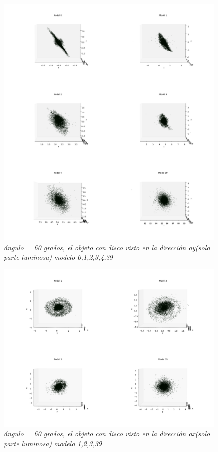 \documentclass[12pt]{article} %
\renewcommand{\=}[1]{\stackrel{#1}{=}} %
\theoremstyle{definition}
\theoremstyle{remark}
\begin{document}
\begin{figure}[!ht]
 \centering
 \includegraphics[scale=0.2]{60deg-m-c2y.png}
 \caption{\emph{ ángulo = 60 grados, el objeto con disco visto en la dirección oy(solo parte luminosa) modelo 0,1,2,3,4,39 }}
\end{figure}

\begin{figure}[!ht]
 \centering
 \includegraphics[scale=0.2]{60deg-m-c2.png}
 \caption{\emph{ ángulo = 60 grados, el objeto con disco visto en la dirección ox(solo parte luminosa) modelo 1,2,3,39 }}
\end{figure}
\end{document}
